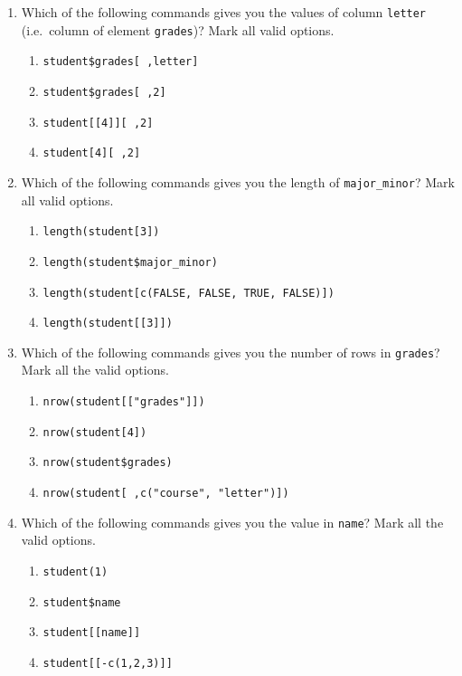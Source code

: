 \documentclass[
]{book}
\providecommand{\tightlist}{%
  \setlength{\itemsep}{0pt}\setlength{\parskip}{0pt}}
\begin{document}
\begin{enumerate}
\def\labelenumi{\alph{enumi})}
\tightlist
\item
  Which of the following commands gives you the values of column \texttt{letter}
  (i.e.~column of element \texttt{grades})? Mark all valid options.

  \begin{enumerate}
  \def\labelenumii{\roman{enumii})}
  \tightlist
  \item
    \texttt{student\$grades{[}\ ,letter{]}}
  \item
    \texttt{student\$grades{[}\ ,2{]}}
  \item
    \texttt{student{[}{[}4{]}{]}{[}\ ,2{]}}
  \item
    \texttt{student{[}4{]}{[}\ ,2{]}}
  \end{enumerate}
\item
  Which of the following commands gives you the length of \texttt{major\_minor}? Mark
  all valid options.

  \begin{enumerate}
  \def\labelenumii{\roman{enumii})}
  \tightlist
  \item
    \texttt{length(student{[}3{]})}
  \item
    \texttt{length(student\$major\_minor)}
  \item
    \texttt{length(student{[}c(FALSE,\ FALSE,\ TRUE,\ FALSE){]})}
  \item
    \texttt{length(student{[}{[}3{]}{]})}
  \end{enumerate}
\item
  Which of the following commands gives you the number of rows in \texttt{grades}?
  Mark all the valid options.

  \begin{enumerate}
  \def\labelenumii{\roman{enumii})}
  \tightlist
  \item
    \texttt{nrow(student{[}{[}"grades"{]}{]})}
  \item
    \texttt{nrow(student{[}4{]})}
  \item
    \texttt{nrow(student\$grades)}
  \item
    \texttt{nrow(student{[}\ ,c("course",\ "letter"){]})}
  \end{enumerate}
\item
  Which of the following commands gives you the value in \texttt{name}?
  Mark all the valid options.

  \begin{enumerate}
  \def\labelenumii{\roman{enumii})}
  \tightlist
  \item
    \texttt{student(1)}
  \item
    \texttt{student\$name}
  \item
    \texttt{student{[}{[}name{]}{]}}
  \item
    \texttt{student{[}{[}-c(1,2,3){]}{]}}
  \end{enumerate}
\end{enumerate}
\end{document}
